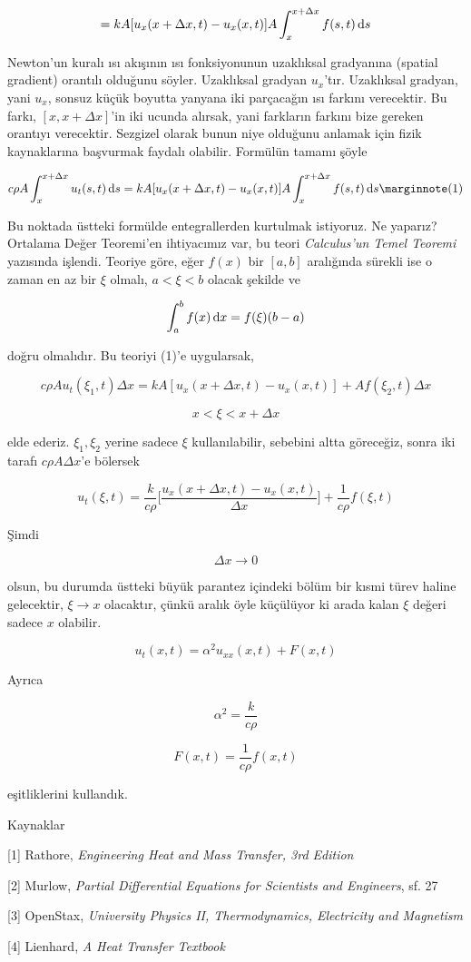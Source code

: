 \documentclass[12pt,fleqn]{article}\usepackage{../../common}
\begin{document}
$$ = kA [ u_x(x+\Delta x,t) - u_x(x,t)] A \int _{x}^{x+\Delta x} f(s,t) \,\mathrm{d} s $$

Newton'un kuralı ısı akışının ısı fonksiyonunun uzaklıksal gradyanına
(spatial gradient) orantılı olduğunu söyler. Uzaklıksal gradyan
$u_x$'tır. Uzaklıksal gradyan, yani $u_x$, sonsuz küçük boyutta yanyana iki
parçacağın ısı farkını verecektir. Bu farkı, $[x,x+\Delta x]$'in iki ucunda
alırsak, yani farkların farkını bize gereken orantıyı verecektir. Sezgizel
olarak bunun niye olduğunu anlamak için fizik kaynaklarına başvurmak
faydalı olabilir. Formülün tamamı şöyle

$$
c\rho A  \int _{ x}^{x+\Delta x} u_t(s,t) \ud s =
kA [ u_x(x+\Delta x,t) - u_x(x,t)] A \int _{x}^{x+\Delta x} f(s,t) \ud s 
\mlabel{1}
$$

Bu noktada üstteki formülde entegrallerden kurtulmak istiyoruz. Ne
yaparız?  Ortalama Değer Teoremi'en ihtiyacımız var, bu teori {\em
  Calculus'un Temel Teoremi} yazısında işlendi. Teoriye göre, eğer $f(x)$
bir $[a,b]$ aralığında sürekli ise o zaman en az bir $\xi$ olmalı, $a <
\xi < b$ olacak şekilde ve

$$ \int _{ a}^{b} f(x) \,\mathrm{d} x = f(\xi)(b-a)  $$

doğru olmalıdır. Bu teoriyi (1)'e uygularsak,

$$ c\rho A u_t(\xi_1,t)\Delta x = 
kA[u_x(x+\Delta x, t) - u_x(x,t)] + 
Af(\xi_2,t)\Delta x
 $$

$$ x < \xi < x+\Delta x $$

elde ederiz. $\xi_1,\xi_2$ yerine sadece $\xi$ kullanılabilir, sebebini
altta göreceğiz, sonra iki tarafı $c\rho A \Delta x$'e bölersek


$$
u_t(\xi,t) =  \frac{k}{c\rho}
\bigg[
\frac{u_x(x+\Delta x,t) - u_x(x,t)} {\Delta x}
\bigg]
+ \frac{ 1}{c\rho}f(\xi,t)
$$

Şimdi 

$$ \Delta x \to 0 $$

olsun, bu durumda üstteki büyük parantez içindeki bölüm bir kısmi türev
haline gelecektir, $\xi \to x$ olacaktır, çünkü aralık öyle küçülüyor ki
arada kalan $\xi$ değeri sadece $x$ olabilir.

$$ u_t(x,t) = \alpha^2u_{xx}(x,t) + F(x,t) $$

Ayrıca

$$ \alpha^2 = \frac{k}{c\rho} $$

$$ F(x,t) = \frac{1}{c\rho}f(x,t) $$

eşitliklerini kullandık.



Kaynaklar

[1] Rathore, {\em Engineering Heat and Mass Transfer, 3rd Edition}

[2] Murlow, {\em Partial Differential Equations for Scientists and Engineers}, sf. 27

[3] OpenStax, {\em University Physics II, Thermodynamics, Electricity and Magnetism}

[4] Lienhard, {\em A Heat Transfer Textbook}
\end{document}
